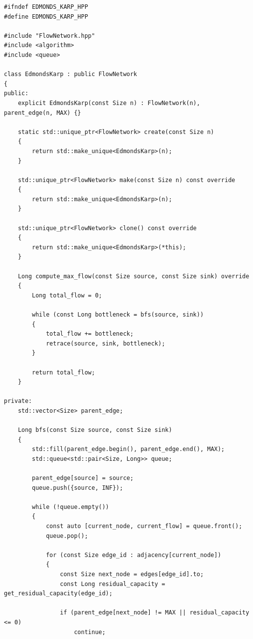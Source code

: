\documentclass[12pt,a4paper]{article}
\begin{document}
\newpage

\label{ap:edmonds_karp}

\begin{lstlisting}[caption={Implementação em C++ da classe \lstinline{EdmondsKarp}, baseada na seleção iterativa de caminhos mais curtos via Busca em Largura (BFS).}, label={lst:edmonds_karp}]
#ifndef EDMONDS_KARP_HPP
#define EDMONDS_KARP_HPP

#include "FlowNetwork.hpp"
#include <algorithm>
#include <queue>

class EdmondsKarp : public FlowNetwork
{
public:
	explicit EdmondsKarp(const Size n) : FlowNetwork(n), parent_edge(n, MAX) {}

	static std::unique_ptr<FlowNetwork> create(const Size n)
	{
		return std::make_unique<EdmondsKarp>(n);
	}

	std::unique_ptr<FlowNetwork> make(const Size n) const override
	{
		return std::make_unique<EdmondsKarp>(n);
	}

	std::unique_ptr<FlowNetwork> clone() const override
	{
		return std::make_unique<EdmondsKarp>(*this);
	}

	Long compute_max_flow(const Size source, const Size sink) override
	{
		Long total_flow = 0;

		while (const Long bottleneck = bfs(source, sink))
		{
			total_flow += bottleneck;
			retrace(source, sink, bottleneck);
		}

		return total_flow;
	}

private:
	std::vector<Size> parent_edge;

	Long bfs(const Size source, const Size sink)
	{
		std::fill(parent_edge.begin(), parent_edge.end(), MAX);
		std::queue<std::pair<Size, Long>> queue;

		parent_edge[source] = source;
		queue.push({source, INF});

		while (!queue.empty())
		{
			const auto [current_node, current_flow] = queue.front();
			queue.pop();

			for (const Size edge_id : adjacency[current_node])
			{
				const Size next_node = edges[edge_id].to;
				const Long residual_capacity = get_residual_capacity(edge_id);

				if (parent_edge[next_node] != MAX || residual_capacity <= 0)
					continue;


\end{lstlisting}
\end{document}
